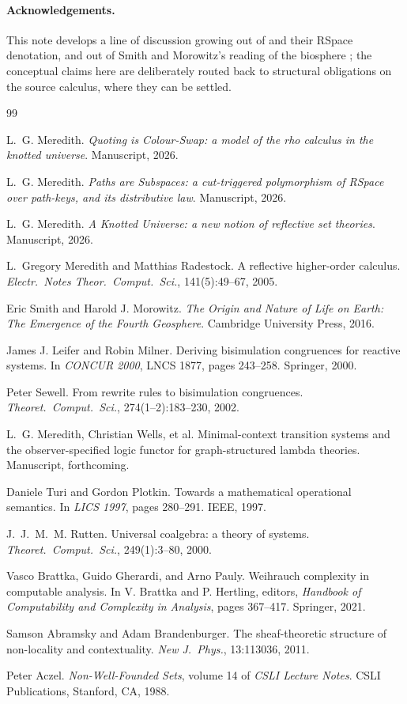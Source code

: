 \documentclass[11pt]{article}
\theoremstyle{definition}
\theoremstyle{plain}
\theoremstyle{remark}
\begin{document}
\paragraph{Acknowledgements.}
This note develops a line of discussion growing out of \cite{qcs,paths} and their
RSpace denotation, and out of Smith and Morowitz's reading of the biosphere
\cite{smith}; the conceptual claims here are deliberately routed back to structural
obligations on the source calculus, where they can be settled.

\begin{thebibliography}{99}

 L.~G. Meredith. \emph{Quoting is Colour-Swap: a model of the rho
calculus in the knotted universe}. Manuscript, 2026.

 L.~G. Meredith. \emph{Paths are Subspaces: a cut-triggered
polymorphism of RSpace over path-keys, and its distributive law}. Manuscript, 2026.

 L.~G. Meredith. \emph{A Knotted Universe: a new notion of reflective
set theories}. Manuscript, 2026.

 L.~Gregory Meredith and Matthias Radestock. A reflective higher-order
calculus. \emph{Electr.\ Notes Theor.\ Comput.\ Sci.}, 141(5):49--67, 2005.

 Eric Smith and Harold J. Morowitz. \emph{The Origin and Nature of
Life on Earth: The Emergence of the Fourth Geosphere}. Cambridge University Press,
2016.

 James J. Leifer and Robin Milner. Deriving bisimulation
congruences for reactive systems. In \emph{CONCUR 2000}, LNCS 1877, pages
243--258. Springer, 2000.

 Peter Sewell. From rewrite rules to bisimulation congruences.
\emph{Theoret.\ Comput.\ Sci.}, 274(1--2):183--230, 2002.

 L.~G. Meredith, Christian Wells, et al. Minimal-context transition
systems and the observer-specified logic functor for graph-structured lambda
theories. Manuscript, forthcoming.

 Daniele Turi and Gordon Plotkin. Towards a mathematical
operational semantics. In \emph{LICS 1997}, pages 280--291. IEEE, 1997.

 J.~J.~M.~M. Rutten. Universal coalgebra: a theory of systems.
\emph{Theoret.\ Comput.\ Sci.}, 249(1):3--80, 2000.

 Vasco Brattka, Guido Gherardi, and Arno Pauly. Weihrauch
complexity in computable analysis. In V. Brattka and P. Hertling, editors,
\emph{Handbook of Computability and Complexity in Analysis}, pages 367--417.
Springer, 2021.

 Samson Abramsky and Adam Brandenburger. The sheaf-theoretic
structure of non-locality and contextuality. \emph{New J.\ Phys.}, 13:113036, 2011.

 Peter Aczel. \emph{Non-Well-Founded Sets}, volume 14 of
\emph{CSLI Lecture Notes}. CSLI Publications, Stanford, CA, 1988.

\end{thebibliography}
\end{document}
